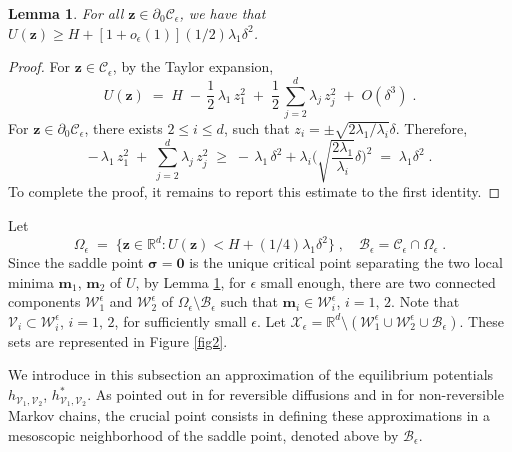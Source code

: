 \documentclass[reqno]{amsart}
\newtheorem{lemma}[theorem]{Lemma}
\newcommand{\mc}[1]{{\mathcal #1}}
\newcommand{\bb}[1]{{\mathbb #1}}
\newcommand{\bs}[1]{{\boldsymbol #1}}
\newcommand{\<}{\langle}
\renewcommand{\>}{\rangle}
\begin{document}
\begin{lemma}
\label{lems0}
For all $\bs{z}\in\partial_{0}\mc{C}_{\epsilon}$, we have that
$U(\bs{z})\ge H+ \left[1+o_{\epsilon}(1)\right]
(1/2)\lambda_{1}\delta^{2}$.
\end{lemma}

\begin{proof}
For $\bs{z}\in\mc{C}_{\epsilon}$, by the Taylor expansion,
\begin{equation*}
U(\bs{z})\;=\;H \;-\, \frac{1}{2} \, \lambda_{1}\, z_{1}^{2}
\;+\; \frac{1}{2} \,  \sum_{j=2}^d \lambda_{j}\, z_{j}^{2}
\;+\; O(\delta^{3})\;.
\end{equation*}
For $\bs{z}\in\partial_{0}\mc{C}_{\epsilon}$, there exists $2\le i\le
d$, such that $z_{i}=\pm\sqrt{2\lambda_{1}/\lambda_{i}}\delta$.
Therefore,
\begin{equation*}
-\, \lambda_{1}\, z_{1}^{2}
\;+\; \sum_{j=2}^d \lambda_{j}\, z_{j}^{2}
\;\ge\; -\, \lambda_{1}\, \delta^{2}
+\lambda_{i} \Big(\sqrt{\frac{2\lambda_{1}}{\lambda_{i}}}\delta\Big)^{2}
\;=\;\lambda_{1}\delta^{2}\;.
\end{equation*}
To complete the proof, it remains to report this estimate to the first
identity.
\end{proof}

Let
\begin{equation*}
\Omega_{\epsilon} \;=\; \big\{\bs{z}\in\bb R^d : U(\bs{z}) <
H+(1/4)\lambda_{1}\delta^{2} \big\}\;, \quad \mc{B}_{\epsilon} =
\mc{C}_{\epsilon} \cap \Omega_{\epsilon}\;.
\end{equation*}
Since the saddle point $\bs \sigma = \bs 0$ is the unique critical
point separating the two local minima $\bs m_1$, $\bs m_2$ of $U$, by
Lemma \ref{lems0}, for $\epsilon$ small enough, there are two
connected components $\mc{W}_{1}^{\epsilon}$ and
$\mc{W}_{2}^{\epsilon}$ of $\Omega_{\epsilon} \setminus
\mc{B}_{\epsilon}$ such that $\bs{m}_{i}\in\mc{W}_{i}^{\epsilon}$,
$i=1,\,2$. Note that $\mc{V}_{i}\subset\mc{W}_{i}^{\epsilon}$,
$i=1,\,2$, for sufficiently small $\epsilon$. Let $\mc{X}_{\epsilon}=
\bb R^d \setminus (\mc{W}_{1}^{\epsilon} \cup \mc{W}_{2}^{\epsilon} \cup
\mc{B}_{\epsilon})$.  These sets are represented in Figure \ref{fig2}.

\smallskip{}
We introduce in this subsection an approximation of the equilibrium
potentials $h_{\mc{V}_{1},\mc{V}_{2}}$,
$h_{\mc{V}_{1},\mc{V}_{2}}^{*}$. As pointed out in \cite{BEGK1} for
reversible diffusions and in \cite{LS1} for non-reversible Markov
chains, the crucial point consists in defining these approximations in
a mesoscopic neighborhood of the saddle point, denoted above by
$\mc{B}_{\epsilon}$.
\end{document}
